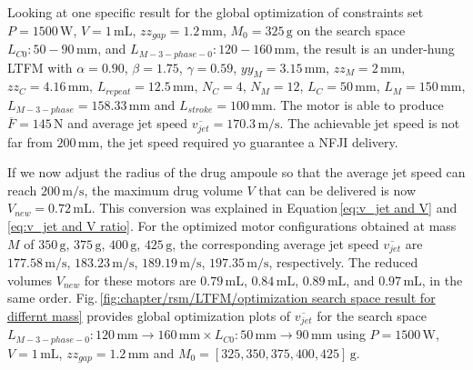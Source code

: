             
            Looking at one specific result for the global optimization of constraints set $P=1500\,\mathrm{W}$, $V=1\,\mathrm{mL}$, $zz_{gap}=1.2\,\mathrm{mm}$, $M_0=325\,\mathrm{g}$ on the search space $L_{C0}:50-90\,\mathrm{mm}$, and $L_{M-3-phase-0}:120-160\,\mathrm{mm}$, the result is an under-hung \acs{LTFM} with $\alpha=0.90$, $\beta=1.75$, $\gamma=0.59$, $yy_M=3.15\,\mathrm{mm}$, $zz_M=2\,\mathrm{mm}$, $zz_C=4.16\,\mathrm{mm}$, $L_{repeat}=12.5\,\mathrm{mm}$, $N_C=4$, $N_M=12$, $L_C=50\,\mathrm{mm}$, $L_M=150\,\mathrm{mm}$, $L_{M-3-phase}=158.33\,\mathrm{mm}$ and $L_{stroke}=100\,\mathrm{mm}$. The motor is able to produce $\overline{F} = 145\,\mathrm{N}$ and average jet speed $\overline{v_{jet}}=170.3\,\mathrm{m/s}$. The achievable jet speed is not far from $200\,\mathrm{mm}$, the jet speed required yo guarantee a \acs{NFJI} delivery. 
            
            
            If we now adjust the radius of the drug ampoule so that the average jet speed can reach $200\,\mathrm{m/s}$, the maximum drug volume $V$ that can be delivered is now $V_{new}=0.72\,\mathrm{mL}$. This conversion was explained in Equation\,\ref{eq:v_jet and V} and \ref{eq:v_jet and V ratio}. For the optimized motor configurations obtained at mass $M$ of $350\,\mathrm{g}$, $375\,\mathrm{g}$, $400\,\mathrm{g}$, $425\,\mathrm{g}$, the corresponding average jet speed $\overline{v_{jet}}$ are $177.58\,\mathrm{m/s}$, $183.23\,\mathrm{m/s}$, $189.19\,\mathrm{m/s}$, $197.35\,\mathrm{m/s}$, respectively. The reduced volumes $V_{new}$ for these motors are $0.79\,\mathrm{mL}$, $0.84\,\mathrm{mL}$, $0.89\,\mathrm{mL}$, and $0.97\,\mathrm{mL}$, in the same order. Fig.\,\ref{fig:chapter/rsm/LTFM/optimization search space result for differnt mass} provides global optimization plots of $\overline{v_{jet}}$ for the search space $L_{M-3-phase-0}:120\,\mathrm{mm}\rightarrow 160\,\mathrm{mm} \times L_{C0}:50\,\mathrm{mm}\rightarrow 90\,\mathrm{mm}$ using $P=1500\,\mathrm{W}$, $V=1\,\mathrm{mL}$, $zz_{gap}=1.2\,\mathrm{mm}$ and $M_0=[325,350,375,400,425]\,\mathrm{g}$. 
        
